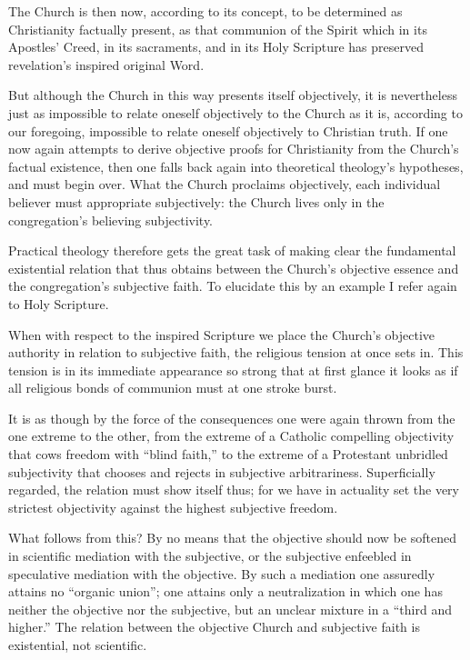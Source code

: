 \documentclass[12pt,a4paper]{book}
\begin{document}
The Church is then now, according to its concept, to be determined as Christianity factually present,
as that communion of the Spirit which in its Apostles' Creed, in its sacraments, and in its Holy
Scripture has preserved revelation's inspired original Word.

But although the Church in this way presents itself objectively, it is nevertheless just as impossible
to relate oneself objectively to the Church as it is, according to our foregoing, impossible to relate
oneself objectively to Christian truth. If one now again attempts to derive objective proofs for
Christianity from the Church's factual existence, then one falls back again into theoretical
theology's hypotheses, and must begin over. What the Church proclaims objectively, each individual
believer must appropriate subjectively: the Church lives only in the congregation's believing
subjectivity.

Practical theology therefore gets the great task of making clear the fundamental existential relation
that thus obtains between the Church's objective essence and the congregation's subjective faith. To
elucidate this by an example I refer again to Holy Scripture.

When with respect to the inspired Scripture we place the Church's objective authority in relation to
subjective faith, the religious tension at once sets in. This tension is in its immediate appearance so
strong that at first glance it looks as if all religious bonds of communion must at one stroke burst.

It is as though by the force of the consequences one were again thrown from the one extreme to the
other, from the extreme of a Catholic compelling objectivity that cows freedom with ``blind faith,'' to
the extreme of a Protestant unbridled subjectivity that chooses and rejects in subjective
arbitrariness. Superficially regarded, the relation must show itself thus; for we have in actuality set
the very strictest objectivity against the highest subjective freedom.

What follows from this? By no means that the objective should now be softened in scientific mediation
with the subjective, or the subjective enfeebled in speculative mediation with the objective. By such a
mediation one assuredly attains no ``organic union''; one attains only a neutralization in which one
has neither the objective nor the subjective, but an unclear mixture in a ``third and higher.'' The
relation between the objective Church and subjective faith is existential, not scientific.
\end{document}
